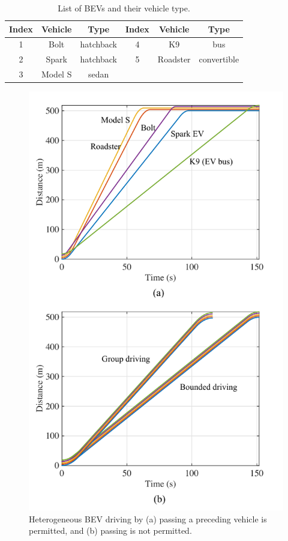 \documentclass{IEEEtran}
\begin{document}
\begin{table} 	%
\centering
\small
\caption{List of BEVs and their vehicle type.}
\label{table:list_EVs}
\begin{tabular}{|c|c|c|c|c|c|} \hline
Index	&Vehicle	&Type		&Index	&Vehicle	&Type 	\\ \hline
1		&Bolt	&hatchback	&4		&K9		&bus			\\ \hline	
2		&Spark	&hatchback	&5		&Roadster&convertible 	\\ \hline
3		&Model S	&sedan	\\ \cline{1-3}
\end{tabular}
\end{table}

\begin{figure}	%
\centering
\includegraphics[width=1.0\hsize]{Figures/Heterogeneous_driving.pdf}
\caption{Heterogeneous BEV driving by (a) passing a preceding vehicle is permitted, and (b) passing is not permitted.}
\label{fig:hetero_driving}
\end{figure} 
\end{document}

